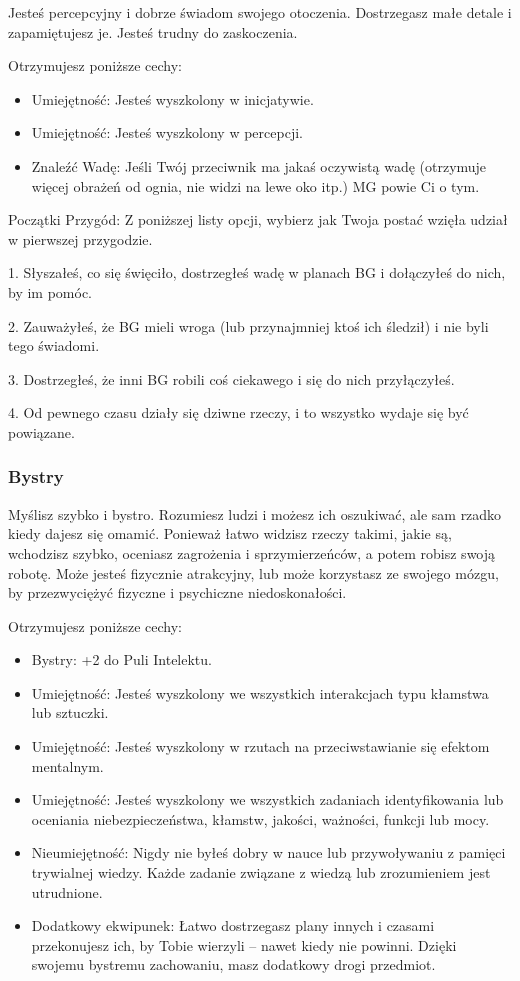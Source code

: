 Jesteś percepcyjny i dobrze świadom swojego otoczenia. Dostrzegasz małe detale i zapamiętujesz je. Jesteś trudny do zaskoczenia.

Otrzymujesz poniższe cechy:
\begin{itemize}
\item Umiejętność: Jesteś wyszkolony w inicjatywie.
\item Umiejętność: Jesteś wyszkolony w percepcji.
\item Znaleźć Wadę: Jeśli Twój przeciwnik ma jakaś oczywistą wadę (otrzymuje więcej obrażeń od ognia, nie widzi na lewe oko itp.) MG powie Ci o tym.
\end{itemize}
    
Początki Przygód: Z poniższej listy opcji, wybierz jak Twoja postać wzięła udział w pierwszej przygodzie.

1. Słyszałeś, co się święciło, dostrzegłeś wadę w planach BG i dołączyłeś do nich, by im pomóc.

2. Zauważyłeś, że BG mieli wroga (lub przynajmniej ktoś ich śledził) i nie byli tego świadomi.

3. Dostrzegłeś, że inni BG robili coś ciekawego i się do nich przyłączyłeś.

4. Od pewnego czasu działy się dziwne rzeczy, i to wszystko wydaje się być powiązane.

\subsubsection{Bystry}

Myślisz szybko i bystro. Rozumiesz ludzi i możesz ich oszukiwać, ale sam rzadko kiedy dajesz się omamić. Ponieważ łatwo widzisz rzeczy takimi, jakie są, wchodzisz szybko, oceniasz zagrożenia i sprzymierzeńców, a potem robisz swoją robotę. Może jesteś fizycznie atrakcyjny, lub może korzystasz ze swojego mózgu, by przezwyciężyć fizyczne i psychiczne niedoskonałości. 

Otrzymujesz poniższe cechy:
\begin{itemize}
\item Bystry: +2 do Puli Intelektu.
\item Umiejętność: Jesteś wyszkolony we wszystkich interakcjach typu kłamstwa lub sztuczki.
\item Umiejętność: Jesteś wyszkolony w rzutach na przeciwstawianie się efektom mentalnym.
\item Umiejętność: Jesteś wyszkolony we wszystkich zadaniach identyfikowania lub oceniania niebezpieczeństwa, kłamstw, jakości, ważności, funkcji lub mocy.
\item Nieumiejętność: Nigdy nie byłeś dobry w nauce lub przywoływaniu z pamięci trywialnej wiedzy. Każde zadanie związane z wiedzą lub zrozumieniem jest utrudnione.
\item Dodatkowy ekwipunek: Łatwo dostrzegasz plany innych i czasami przekonujesz ich, by Tobie wierzyli – nawet kiedy nie powinni. Dzięki swojemu bystremu zachowaniu, masz dodatkowy drogi przedmiot.
\end{itemize}

